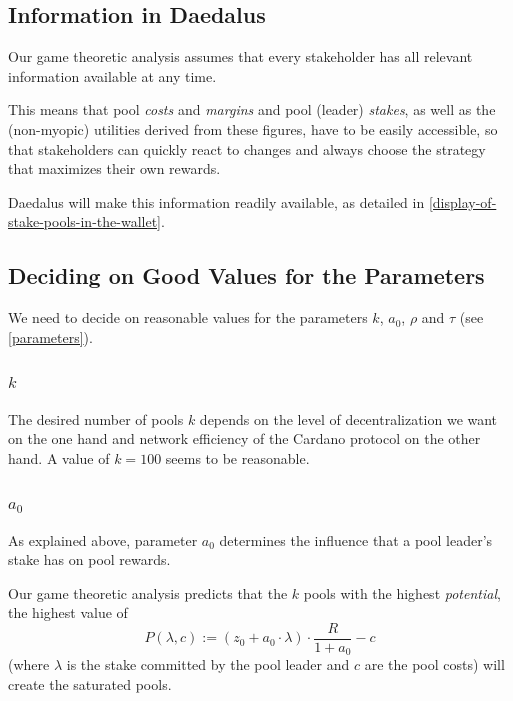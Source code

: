 \documentclass[11pt,a4paper]{article}
\begin{document}
\subsection{Information in Daedalus}
\label{information-in-daedalus}

Our game theoretic analysis assumes that every stakeholder has all
relevant information available at any time.

This means that pool \emph{costs} and \emph{margins} and pool (leader)
\emph{stakes}, as well as the (non-myopic) utilities derived from these
figures, have to be easily accessible, so that stakeholders can quickly
react to changes and always choose the strategy that maximizes their own
rewards.

Daedalus will make this information readily available, as detailed in
\cref{display-of-stake-pools-in-the-wallet}. 

\subsection{Deciding on Good Values for the Parameters}
\label{deciding-on-good-values-for-the-parameters}

We need to decide on reasonable values for the parameters \(k\),
\(a_0\), \(\rho\) and \(\tau\) (see \cref{parameters}).

\subsubsection{\texorpdfstring{\(k\)}{k}}

The desired number of pools \(k\) depends on the level of
decentralization we want on the one hand and network efficiency of the
Cardano protocol on the other hand. A value of \(k=100\) seems to be
reasonable.

\subsubsection{\texorpdfstring{\(a_0\)}{a\_0}}

As explained above, parameter \(a_0\) determines the influence that a
pool leader's stake has on pool rewards.

Our game theoretic analysis predicts that the \(k\) pools with the
highest \emph{potential}, the highest value of \[
    P(\lambda,c):=\left(z_0+a_0\cdot\lambda\right)\cdot\frac{R}{1+a_0}-c
\] (where \(\lambda\) is the stake committed by the pool leader and \(c\)
are the pool costs) will create the saturated pools.
\end{document}
